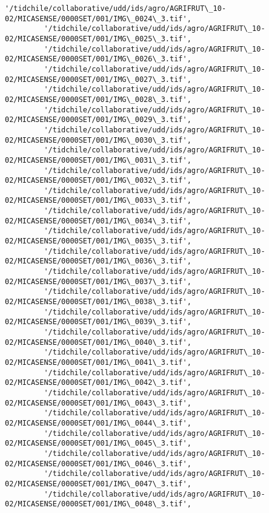 \documentclass[11pt]{article}
\begin{document}
\begin{Verbatim}[commandchars=\\\{\}]
         '/tidchile/collaborative/udd/ids/agro/AGRIFRUT\_10-02/MICASENSE/0000SET/001/IMG\_0024\_3.tif',
         '/tidchile/collaborative/udd/ids/agro/AGRIFRUT\_10-02/MICASENSE/0000SET/001/IMG\_0025\_3.tif',
         '/tidchile/collaborative/udd/ids/agro/AGRIFRUT\_10-02/MICASENSE/0000SET/001/IMG\_0026\_3.tif',
         '/tidchile/collaborative/udd/ids/agro/AGRIFRUT\_10-02/MICASENSE/0000SET/001/IMG\_0027\_3.tif',
         '/tidchile/collaborative/udd/ids/agro/AGRIFRUT\_10-02/MICASENSE/0000SET/001/IMG\_0028\_3.tif',
         '/tidchile/collaborative/udd/ids/agro/AGRIFRUT\_10-02/MICASENSE/0000SET/001/IMG\_0029\_3.tif',
         '/tidchile/collaborative/udd/ids/agro/AGRIFRUT\_10-02/MICASENSE/0000SET/001/IMG\_0030\_3.tif',
         '/tidchile/collaborative/udd/ids/agro/AGRIFRUT\_10-02/MICASENSE/0000SET/001/IMG\_0031\_3.tif',
         '/tidchile/collaborative/udd/ids/agro/AGRIFRUT\_10-02/MICASENSE/0000SET/001/IMG\_0032\_3.tif',
         '/tidchile/collaborative/udd/ids/agro/AGRIFRUT\_10-02/MICASENSE/0000SET/001/IMG\_0033\_3.tif',
         '/tidchile/collaborative/udd/ids/agro/AGRIFRUT\_10-02/MICASENSE/0000SET/001/IMG\_0034\_3.tif',
         '/tidchile/collaborative/udd/ids/agro/AGRIFRUT\_10-02/MICASENSE/0000SET/001/IMG\_0035\_3.tif',
         '/tidchile/collaborative/udd/ids/agro/AGRIFRUT\_10-02/MICASENSE/0000SET/001/IMG\_0036\_3.tif',
         '/tidchile/collaborative/udd/ids/agro/AGRIFRUT\_10-02/MICASENSE/0000SET/001/IMG\_0037\_3.tif',
         '/tidchile/collaborative/udd/ids/agro/AGRIFRUT\_10-02/MICASENSE/0000SET/001/IMG\_0038\_3.tif',
         '/tidchile/collaborative/udd/ids/agro/AGRIFRUT\_10-02/MICASENSE/0000SET/001/IMG\_0039\_3.tif',
         '/tidchile/collaborative/udd/ids/agro/AGRIFRUT\_10-02/MICASENSE/0000SET/001/IMG\_0040\_3.tif',
         '/tidchile/collaborative/udd/ids/agro/AGRIFRUT\_10-02/MICASENSE/0000SET/001/IMG\_0041\_3.tif',
         '/tidchile/collaborative/udd/ids/agro/AGRIFRUT\_10-02/MICASENSE/0000SET/001/IMG\_0042\_3.tif',
         '/tidchile/collaborative/udd/ids/agro/AGRIFRUT\_10-02/MICASENSE/0000SET/001/IMG\_0043\_3.tif',
         '/tidchile/collaborative/udd/ids/agro/AGRIFRUT\_10-02/MICASENSE/0000SET/001/IMG\_0044\_3.tif',
         '/tidchile/collaborative/udd/ids/agro/AGRIFRUT\_10-02/MICASENSE/0000SET/001/IMG\_0045\_3.tif',
         '/tidchile/collaborative/udd/ids/agro/AGRIFRUT\_10-02/MICASENSE/0000SET/001/IMG\_0046\_3.tif',
         '/tidchile/collaborative/udd/ids/agro/AGRIFRUT\_10-02/MICASENSE/0000SET/001/IMG\_0047\_3.tif',
         '/tidchile/collaborative/udd/ids/agro/AGRIFRUT\_10-02/MICASENSE/0000SET/001/IMG\_0048\_3.tif',

\end{Verbatim}
\end{document}
